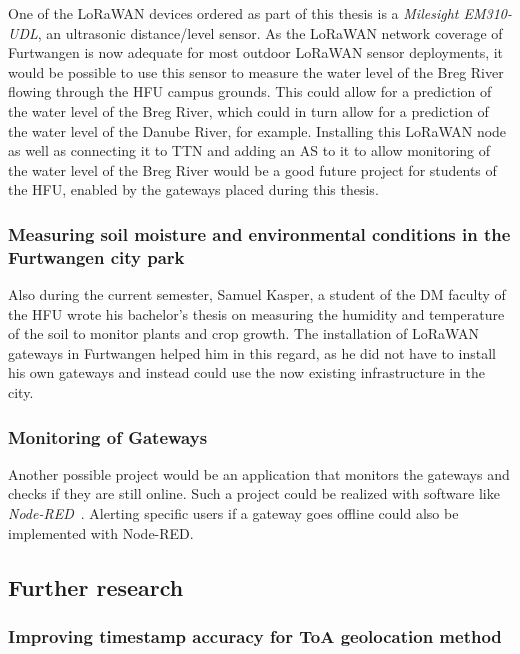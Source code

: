 One of the \ac{LoRaWAN} devices ordered as part of this thesis is a \emph{Milesight EM310-UDL}, an ultrasonic distance/level sensor.
As the \ac{LoRaWAN} network coverage of Furtwangen is now adequate for most outdoor \ac{LoRaWAN} sensor deployments, it would be possible to use this sensor to measure the water level of the Breg River flowing through the \ac{HFU} campus grounds.
This could allow for a prediction of the water level of the Breg River, which could in turn allow for a prediction of the water level of the Danube River, for example.
Installing this \ac{LoRaWAN} node as well as connecting it to \ac{TTN} and adding an \acf{AS} to it to allow monitoring of the water level of the Breg River would be a good future project for students of the \ac{HFU}, enabled by the gateways placed during this thesis.

\subsubsection{Measuring soil moisture and environmental conditions in the Furtwangen city park}

Also during the current semester, Samuel Kasper, a student of the \ac{DM} faculty of the \ac{HFU} wrote his bachelor's thesis on measuring the humidity and temperature of the soil to monitor plants and crop growth.
The installation of \ac{LoRaWAN} gateways in Furtwangen helped him in this regard, as he did not have to install his own gateways and instead could use the now existing infrastructure in the city.

\subsubsection{Monitoring of Gateways}

Another possible project would be an application that monitors the gateways and checks if they are still online.
Such a project could be realized with software like \emph{Node-RED}~\cite{openjs_foundation_node-red_nodate}.
Alerting specific users if a gateway goes offline could also be implemented with Node-RED.

\subsection{Further research}

\subsubsection{Improving timestamp accuracy for \acf{ToA} geolocation method}

